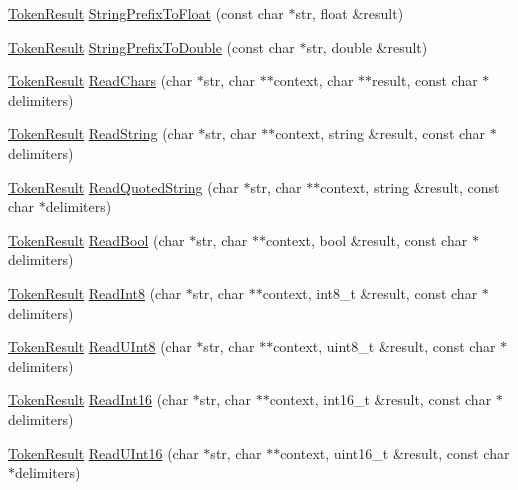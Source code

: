 \begin{DoxyCompactItemize}
\hyperlink{namespacemage_a2178ba2411db5912f41b2e7698c2037d}{Token\+Result} \hyperlink{namespacemage_a760872d7402dea494afc7e402c7b38da}{String\+Prefix\+To\+Float} (const char $\ast$str, float \&result)
\item 
\hyperlink{namespacemage_a2178ba2411db5912f41b2e7698c2037d}{Token\+Result} \hyperlink{namespacemage_a289525f635f3921024dd10dd6073a555}{String\+Prefix\+To\+Double} (const char $\ast$str, double \&result)
\item 
\hyperlink{namespacemage_a2178ba2411db5912f41b2e7698c2037d}{Token\+Result} \hyperlink{namespacemage_a5f2717cd5b7cfa9a43396e628e18a5d0}{Read\+Chars} (char $\ast$str, char $\ast$$\ast$context, char $\ast$$\ast$result, const char $\ast$delimiters)
\item 
\hyperlink{namespacemage_a2178ba2411db5912f41b2e7698c2037d}{Token\+Result} \hyperlink{namespacemage_aa4f9ae6b6aa815ab879d4ea1f0453172}{Read\+String} (char $\ast$str, char $\ast$$\ast$context, string \&result, const char $\ast$delimiters)
\item 
\hyperlink{namespacemage_a2178ba2411db5912f41b2e7698c2037d}{Token\+Result} \hyperlink{namespacemage_a0d98db3ab52b137bc811727c68659329}{Read\+Quoted\+String} (char $\ast$str, char $\ast$$\ast$context, string \&result, const char $\ast$delimiters)
\item 
\hyperlink{namespacemage_a2178ba2411db5912f41b2e7698c2037d}{Token\+Result} \hyperlink{namespacemage_af0a37dab7ba4c58335ff1e84d7279c1c}{Read\+Bool} (char $\ast$str, char $\ast$$\ast$context, bool \&result, const char $\ast$delimiters)
\item 
\hyperlink{namespacemage_a2178ba2411db5912f41b2e7698c2037d}{Token\+Result} \hyperlink{namespacemage_a53968b4c1082fa6042a1278a1fb628d1}{Read\+Int8} (char $\ast$str, char $\ast$$\ast$context, int8\+\_\+t \&result, const char $\ast$delimiters)
\item 
\hyperlink{namespacemage_a2178ba2411db5912f41b2e7698c2037d}{Token\+Result} \hyperlink{namespacemage_a357352c06cab6568efee62ddc9dcc6c9}{Read\+U\+Int8} (char $\ast$str, char $\ast$$\ast$context, uint8\+\_\+t \&result, const char $\ast$delimiters)
\item 
\hyperlink{namespacemage_a2178ba2411db5912f41b2e7698c2037d}{Token\+Result} \hyperlink{namespacemage_ae5362fb3f4d97bcecd70e5baeb22834f}{Read\+Int16} (char $\ast$str, char $\ast$$\ast$context, int16\+\_\+t \&result, const char $\ast$delimiters)
\item 
\hyperlink{namespacemage_a2178ba2411db5912f41b2e7698c2037d}{Token\+Result} \hyperlink{namespacemage_a8e94422a0e962b98b2555bc95c6eff4c}{Read\+U\+Int16} (char $\ast$str, char $\ast$$\ast$context, uint16\+\_\+t \&result, const char $\ast$delimiters)
$$
\end{DoxyCompactItemize}
